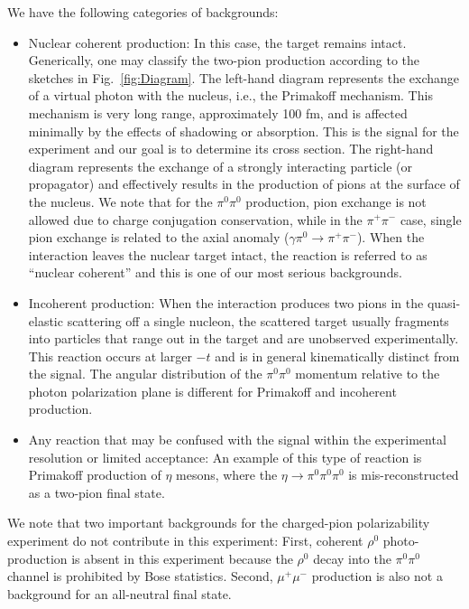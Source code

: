 We have the following categories of backgrounds:
\begin{itemize}
\item Nuclear coherent production: In this case, the target remains
  intact. Generically, one may classify the two-pion production
  according to the sketches in Fig.~\ref{fig:Diagram}. The left-hand
  diagram represents the exchange of a virtual photon with the
  nucleus, i.e., the Primakoff mechanism. This mechanism is very long
  range, approximately 100 fm, and is affected minimally by the
  effects of shadowing or absorption.  This is the signal for the
  experiment and our goal is to determine its cross section.  The
  right-hand diagram represents the exchange of a strongly interacting
  particle (or propagator) and effectively results in the production
  of pions at the surface of the nucleus. We note that for the
  $\pi^0\pi^0$ production, pion exchange is not allowed due to charge
  conjugation conservation, while in the $\pi^+\pi^-$ case, single
  pion exchange is related to the axial anomaly ($\gamma \pi^0
  \rightarrow \pi^+ \pi^-$).  When the interaction leaves the nuclear
  target intact, the reaction is referred to as ``nuclear coherent''
  and this is one of our most serious backgrounds.
\item Incoherent production: When the interaction produces two pions
  in the quasi-elastic scattering off a single nucleon, the scattered
  target usually fragments into particles that range out in the target
  and are unobserved experimentally. This reaction occurs at larger
  $-t$ and is in general kinematically distinct from the signal. The
  angular distribution of the $\pi^0\pi^0$ momentum relative to the
  photon polarization plane is different for Primakoff and incoherent
  production.
\item Any reaction that may be confused with the signal within the
  experimental resolution or limited acceptance: An example of this
  type of reaction is Primakoff production of $\eta$ mesons, where the
  $\eta\rightarrow \pi^0 \pi^0 \pi^0$ is mis-reconstructed as a
  two-pion final state.
\end{itemize}

We note that two important backgrounds for the charged-pion
polarizability experiment do not contribute in this experiment: First,
coherent $\rho^0$ photo-production is absent in this experiment
because the $\rho^0$ decay into the $\pi^0\pi^0$ channel is prohibited
by Bose statistics.  Second, $\mu^+\mu^-$ production is also not a
background for an all-neutral final state.

